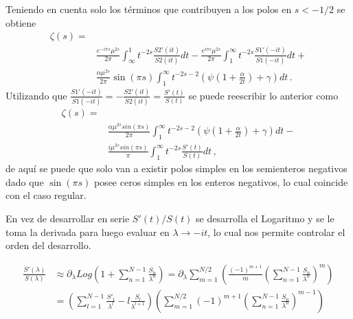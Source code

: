 Teniendo en cuenta solo los términos que contribuyen a los polos en  $s < -1/2$ se obtiene
\begin{equation}
\begin{aligned}
 \zeta  (s) =& \\[10pt]
& \frac{e ^{- i \pi s} \mu ^{2s } }{2 \pi}
\int _{\infty} ^{1} t ^{-2s } 
		\frac{S2' (it)}{S2 (it)}
		d t
	- 
\frac{e ^{i \pi s} \mu ^{2s}}{2 \pi}
\int _{1} ^{\infty} t ^{-2s } 
	\frac{S1' (-it)}{S1(-it)}
	d t +
	 \\[10pt]
	&  \frac{\alpha \mu ^{2s} }{2 \pi }	\sin ( \pi s)  \int _1 ^{\infty}
	t ^{-2s-2} \left( \psi \left( 1 + \frac{\alpha}{2 t}\right) + \gamma \right) dt 
		\, .
\end{aligned}
\end{equation}
Utilizando que  $\frac{S1' (-it)}{S1 (-i t)} = - \frac{S2 ' (i t)}{S2(it)} = \frac{S'(t)}{S(t)}  $ se puede reescribir lo anterior como
\begin{equation}
\begin{aligned}
\zeta  (s) =&  \\[5pt]
&
\frac{\alpha \mu ^{2s} sin( \pi s )}{2 \pi } \int _{1} ^{\infty} 
t ^{-2s-2} \left( \psi (1 + \frac{\alpha}{2 t}) + \gamma \right) dt -\\[5pt]
&   \frac{i \mu ^{2s}  sin (\pi s)}{\pi} \int _1 ^{\infty} t ^{-2s} \frac{S'(t)}{S(t)} dt 
	\, ,
\end{aligned}
\end{equation}
de aquí se puede que solo van a existir polos simples en los semienteros negativos dado que $\sin (\pi s)$ posee ceros simples en los enteros negativos, lo cual coincide con el caso regular.

En vez de desarrollar en serie $S'(t) / S (t)$ se desarrolla el Logaritmo y se le toma la derivada para luego evaluar en $\lambda \rightarrow -i t$, lo cual nos permite controlar el orden del desarrollo.

\begin{equation}
\begin{aligned}
\frac{S'( \lambda)}{S( \lambda )} &\approx 
\partial _{\lambda} Log \left(
								1 + \sum _{n=1} ^{N-1}  \frac{S _n}{\lambda ^n}
								\right) =
\partial _{\lambda} 
\sum _{m = 1} ^{N/2} 
	\left(
	\frac{(-1) ^{m+1} }{m}
	\left(
		\sum _{n=1} ^{N-1} \frac{S _n}{\lambda ^n}
		\right) ^m 
	\right)  \\[10pt]
	&=
\left(								
	\sum _{l = 1} ^{N-1} 
	\frac{S' _l}{\lambda ^l} - l \frac{S _l}{\lambda ^{l+1}}
	\right)							
\left(
	\sum _{m = 1} ^{N/2} (-1) ^{m+1} 
	\left(
			\sum _{n=1} ^{N-1} \frac{S _n}{\lambda ^n}
			\right) ^{m-1}		
	\right)
\end{aligned}	
\end{equation}



